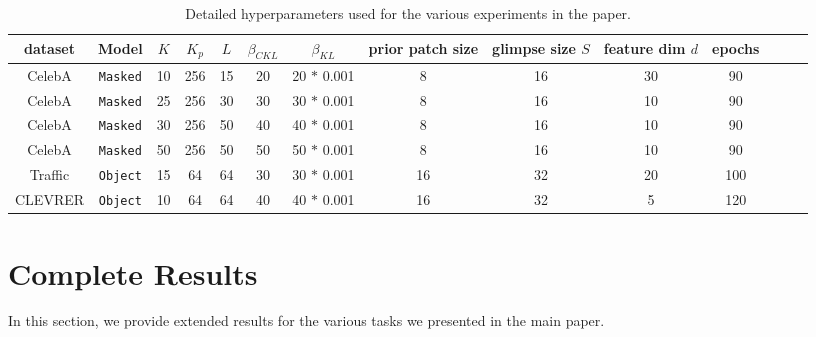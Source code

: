 \documentclass[nohyperref]{article}
\theoremstyle{plain}
\theoremstyle{definition}
\theoremstyle{remark}
\begin{document}
\begin{table}
\setlength{\tabcolsep}{4pt}
    \centering
    \begin{tabular}{cccccccccccccc}
    \toprule
    dataset                      & Model            & $K$ & $K_p$ & $L$ & $\beta_{CKL}$ & $\beta_{KL}$ & prior patch size & glimpse size $S$ & feature dim $d$ & epochs       \\ \midrule
    CelebA                      & \texttt{Masked}   & 10  &    256    &  15  &    20         &  20 $*$ 0.001 &       8          &    16     &      30           & 90       \\
    CelebA                      & \texttt{Masked}   & 25  &    256     & 30    &     30      &  30 $*$ 0.001 &        8          &    16  &        10           & 90    \\
    CelebA                      & \texttt{Masked}   & 30  &   256      &  50  &      40      &  40 $*$ 0.001 &        8          &  16       &      10          & 90         \\
    CelebA                      & \texttt{Masked}   & 50  &    256     &  50  &       50      &  50 $*$ 0.001 &        8          &   16   &        10          & 90         \\ \midrule
    Traffic                     & \texttt{Object}   & 15  &     64    &  64    &      30          & 30  $*$ 0.001 &        16     &        32          &  20         &  100          \\
    CLEVRER                     & \texttt{Object}   & 10  &    64     &  64    &     40           & 40 $*$ 0.001 &       16        &       32          &    5         & 120          \\ \bottomrule
    \end{tabular}
    \caption{Detailed hyperparameters used for the various experiments in the paper.}
    \label{tab_apndx:hyp}
\end{table}


\section{Complete Results}
\label{apndx:res}
In this section, we provide extended results for the various tasks we presented in the main paper.
\end{document}

